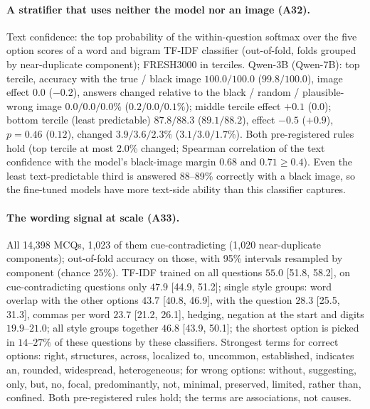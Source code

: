 \paragraph{A stratifier that uses neither the model nor an image (A32).}
Text confidence: the top probability of the within-question softmax over the five option scores of a word and bigram TF-IDF classifier (out-of-fold, folds grouped by near-duplicate component); FRESH3000 in terciles.
Qwen-3B (Qwen-7B): top tercile, accuracy with the true / black image $100.0/100.0$ ($99.8/100.0$), image effect $0.0$ ($-0.2$), answers changed relative to the black / random / plausible-wrong image $0.0/0.0/0.0\%$ ($0.2/0.0/0.1\%$); middle tercile effect $+0.1$ ($0.0$); bottom tercile (least predictable) $87.8/88.3$ ($89.1/88.2$), effect $-0.5$ ($+0.9$), $p=0.46$ ($0.12$), changed $3.9/3.6/2.3\%$ ($3.1/3.0/1.7\%$).
Both pre-registered rules hold (top tercile at most 2.0\% changed; Spearman correlation of the text confidence with the model's black-image margin $0.68$ and $0.71\ge0.4$).
Even the least text-predictable third is answered 88--89\% correctly with a black image, so the fine-tuned models have more text-side ability than this classifier captures.

\paragraph{The wording signal at scale (A33).}
All 14{,}398 MCQs, 1{,}023 of them cue-contradicting (1{,}020 near-duplicate components); out-of-fold accuracy on those, with 95\% intervals resampled by component (chance 25\%).
TF-IDF trained on all questions $55.0$ [51.8, 58.2], on cue-contradicting questions only $47.9$ [44.9, 51.2]; single style groups: word overlap with the other options $43.7$ [40.8, 46.9], with the question $28.3$ [25.5, 31.3], commas per word $23.7$ [21.2, 26.1], hedging, negation at the start and digits $19.9$--$21.0$; all style groups together $46.8$ [43.9, 50.1]; the shortest option is picked in $14$--$27\%$ of these questions by these classifiers.
Strongest terms for correct options: right, structures, across, localized to, uncommon, established, indicates an, rounded, widespread, heterogeneous; for wrong options: without, suggesting, only, but, no, focal, predominantly, not, minimal, preserved, limited, rather than, confined.
Both pre-registered rules hold; the terms are associations, not causes.

